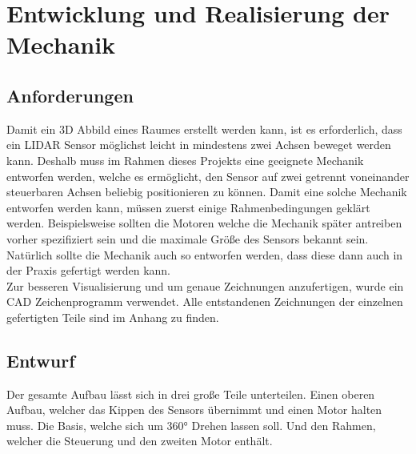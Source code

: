 \chapter{Entwicklung und Realisierung der Mechanik}\label{chap:mechanik}

\section{Anforderungen}
Damit ein \acs{3D} Abbild eines Raumes erstellt werden kann, ist es erforderlich, dass ein \ac{LIDAR} Sensor möglichst leicht in mindestens zwei Achsen beweget werden kann. Deshalb muss im Rahmen dieses Projekts eine geeignete Mechanik entworfen werden, welche es ermöglicht, den Sensor auf zwei getrennt voneinander steuerbaren Achsen beliebig positionieren zu können. Damit eine solche Mechanik entworfen werden kann, müssen zuerst einige Rahmenbedingungen geklärt werden. Beispielsweise sollten die Motoren welche die Mechanik später antreiben vorher spezifiziert sein und die maximale Größe des Sensors bekannt sein. Natürlich sollte die Mechanik auch so entworfen werden, dass diese dann auch in der Praxis gefertigt werden kann.\\
Zur besseren Visualisierung und um genaue Zeichnungen anzufertigen, wurde ein \ac{CAD} Zeichenprogramm verwendet. Alle entstandenen Zeichnungen der einzelnen gefertigten Teile sind im Anhang zu finden.
\section{Entwurf}
Der gesamte Aufbau lässt sich in drei große Teile unterteilen. Einen oberen Aufbau, welcher das Kippen des Sensors übernimmt und einen Motor halten muss. Die Basis, welche sich um 360° Drehen lassen soll. Und den Rahmen, welcher die Steuerung und den zweiten Motor enthält. 

